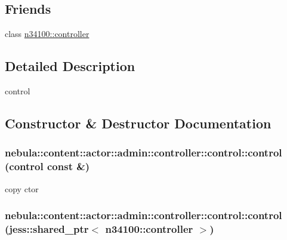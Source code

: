 \subsection*{Friends}
\begin{DoxyCompactItemize}
\item 
class \hyperlink{classnebula_1_1content_1_1actor_1_1admin_1_1controller_1_1control_a73e093bffbf51077b70ffed7fb8078f3}{n34100::controller}
\end{DoxyCompactItemize}


\subsection{Detailed Description}
control 

\subsection{Constructor \& Destructor Documentation}
\hypertarget{classnebula_1_1content_1_1actor_1_1admin_1_1controller_1_1control_aae149423fa937bba3a4e4f884e0bd496}{
\subsubsection[{control}]{\setlength{\rightskip}{0pt plus 5cm}nebula::content::actor::admin::controller::control::control ({\bf control} const \&)}}
\label{classnebula_1_1content_1_1actor_1_1admin_1_1controller_1_1control_aae149423fa937bba3a4e4f884e0bd496}
copy ctor \hypertarget{classnebula_1_1content_1_1actor_1_1admin_1_1controller_1_1control_a6a7047e33948c6ca81008c3fab59d260}{
\subsubsection[{control}]{\setlength{\rightskip}{0pt plus 5cm}nebula::content::actor::admin::controller::control::control (jess::shared\_\-ptr$<$ {\bf n34100::controller} $>$)}}
\label{classnebula_1_1content_1_1actor_1_1admin_1_1controller_1_1control_a6a7047e33948c6ca81008c3fab59d260}


